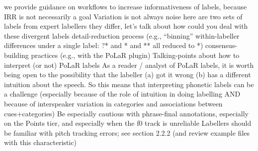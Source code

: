 \markdownRendererUlEndTight \markdownRendererUlItemEnd 
\markdownRendererUlEndTight \markdownRendererUlItemEnd 
\markdownRendererUlItem we provide guidance on workflows to increase informativeness of labels, because IRR is not necessarily a goal\markdownRendererInterblockSeparator
{}\markdownRendererUlBeginTight
\markdownRendererUlItem {}\markdownRendererUlItemEnd 
\markdownRendererUlItem Variation is not always noise\markdownRendererInterblockSeparator
{}\markdownRendererUlBeginTight
\markdownRendererUlItem here are two sets of labels from expert labellers\markdownRendererUlItemEnd 
\markdownRendererUlItem they differ, let’s talk about how could you deal with these divergent labels\markdownRendererInterblockSeparator
{}\markdownRendererUlBeginTight
\markdownRendererUlItem detail-reduction process (e.g., “binning” within-labeller differences under a single label: ?* and * and ** all reduced to *)\markdownRendererUlItemEnd 
\markdownRendererUlItem consensus-building practices (e.g., with the PoLaR plugin)\markdownRendererUlItemEnd 
\markdownRendererUlEndTight \markdownRendererUlItemEnd 
\markdownRendererUlEndTight \markdownRendererUlItemEnd 
\markdownRendererUlItem {}\markdownRendererUlItemEnd 
\markdownRendererUlEndTight \markdownRendererUlItemEnd 
\markdownRendererUlItem Talking-points about how to interpret (or not) PoLaR labels\markdownRendererInterblockSeparator
{}\markdownRendererUlBeginTight
\markdownRendererUlItem As a reader / analyst of PoLaR labels, it is worth being open to the possibility that the labeller (a) got it wrong  (b) has a different intuition about the speech. So this means that interpreting phonetic labels can be a challenge (especially because of the role of intuition in doing labelling AND because of interspeaker variation in categories and associations between cues+categories)\markdownRendererUlItemEnd 
\markdownRendererUlItem Be especially cautious with phrase-final annotations, especially on the Points tier, and especially when the f0 track is unreliable\markdownRendererInterblockSeparator
{}\markdownRendererUlBeginTight
\markdownRendererUlItem Labellers should be familiar with pitch tracking errors; see section 2.2.2 (and review example files with this characteristic)\markdownRendererUlItemEnd 
\markdownRendererUlEndTight \markdownRendererUlItemEnd 
\markdownRendererUlEndTight \markdownRendererUlItemEnd 
